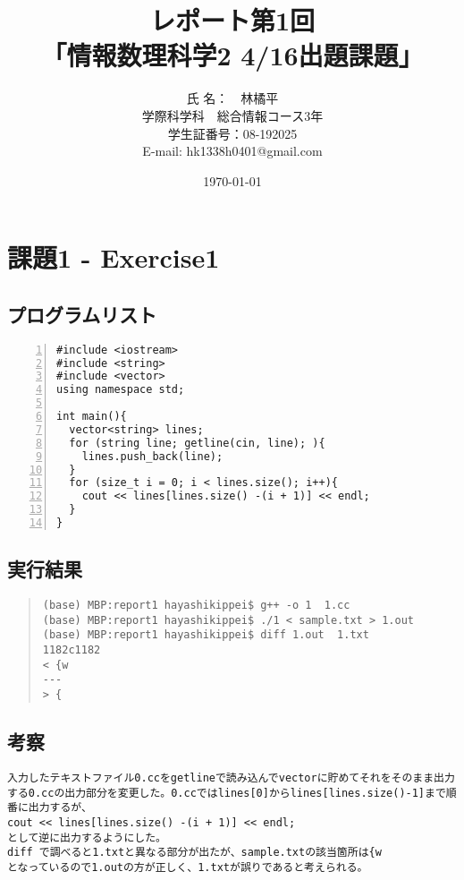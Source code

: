 \documentclass[11pt,a4paper]{jsarticle}
\title{レポート第1回 \\
  「情報数理科学2 4/16出題課題」}
\author{氏 名：　林橘平\\
        学際科学科　総合情報コース3年 \\
        学生証番号：08-192025 \\
        E-mail: hk1338h0401@gmail.com}
\date{\today}
\begin{document}
\maketitle
%
\section{課題1 - Exercise1}
\subsection{プログラムリスト}
\label{sec:prog-list1}

\begin{lstlisting}[numbers=left,numberstyle=\ttfamily,xleftmargin=2zw]
#include <iostream>
#include <string>
#include <vector>
using namespace std;

int main(){
  vector<string> lines;
  for (string line; getline(cin, line); ){
    lines.push_back(line);
  }
  for (size_t i = 0; i < lines.size(); i++){
    cout << lines[lines.size() -(i + 1)] << endl;
  }
}

\end{lstlisting}
%
\subsection{実行結果}
\label{sec:results1}

\begin{quote}           %
\begin{verbatim}
(base) MBP:report1 hayashikippei$ g++ -o 1  1.cc
(base) MBP:report1 hayashikippei$ ./1 < sample.txt > 1.out
(base) MBP:report1 hayashikippei$ diff 1.out  1.txt 
1182c1182
< {w
---
> {

\end{verbatim}
\end{quote}
%
\subsection{考察}
\begin{verbatim}
入力したテキストファイル0.ccをgetlineで読み込んでvectorに貯めてそれをそのまま出力する0.ccの出力部分を変更した。0.ccではlines[0]からlines[lines.size()-1]まで順番に出力するが、
cout << lines[lines.size() -(i + 1)] << endl;
として逆に出力するようにした。
diff で調べると1.txtと異なる部分が出たが、sample.txtの該当箇所は{w
となっているので1.outの方が正しく、1.txtが誤りであると考えられる。
\end{verbatim}
%
\end{document}
